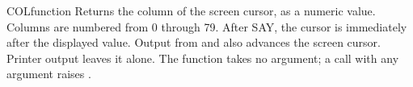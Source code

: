 \begin{XbaseEntry}{COL}{function}
Returns the column of the screen cursor, as a numeric value.
\Syntax
{}
\Usage
Columns are numbered from 0 through 79.  After  SAY, the cursor is
immediately after the displayed value.  Output from  and 
also advances the screen cursor.  Printer output leaves it alone.
The function takes no argument; a call with any argument raises
.
\Examples
{}
\end{XbaseEntry}
